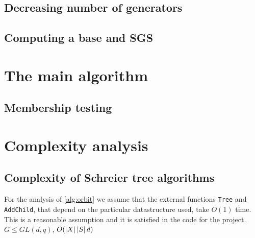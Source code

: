 \subsection{Decreasing number of generators}

\subsection{Computing a base and SGS}

\section{The main algorithm}

\subsection{Membership testing}

\section{Complexity analysis}

\subsection{Complexity of Schreier tree algorithms}
For the analysis of \ref{alg:orbit} we assume that the external functions \texttt{Tree} and \texttt{AddChild}, that depend on the particular datastructure used, take $O(1)$ time. This is a reasonable assumption and it is satisfied in the code for the project. $G \leq GL(d, q)$, $O(\left\lvert X \right\rvert \left\lvert S \right\rvert d)$
